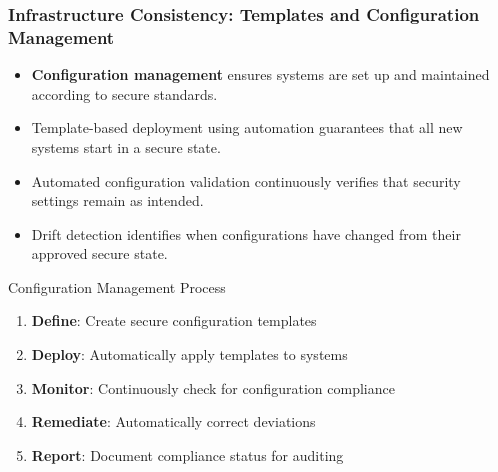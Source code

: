 \documentclass{beamer}
\begin{document}
\begin{frame}
  \frametitle{Infrastructure Consistency: Templates and Configuration Management}
  
  \begin{itemize}
    \item \textbf{Configuration management} ensures systems are set up and maintained according to secure standards.
    \item Template-based deployment using automation guarantees that all new systems start in a secure state.
    \item Automated configuration validation continuously verifies that security settings remain as intended.
    \item Drift detection identifies when configurations have changed from their approved secure state.
  \end{itemize}
  
  \begin{block}{Configuration Management Process}
    \scriptsize
    \begin{enumerate}
      \item \textbf{Define}: Create secure configuration templates
      \item \textbf{Deploy}: Automatically apply templates to systems
      \item \textbf{Monitor}: Continuously check for configuration compliance
      \item \textbf{Remediate}: Automatically correct deviations
      \item \textbf{Report}: Document compliance status for auditing
    \end{enumerate}
  \end{block}
\end{frame}
\end{document}
